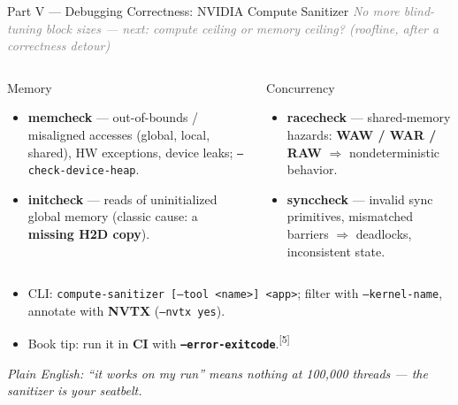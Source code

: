 \documentclass[aspectratio=169]{beamer}
\newcommand{\kw}[1]{\textbf{\textcolor{kwblue}{#1}}}
\newcommand{\pe}[1]{\par{\setlength{\fboxsep}{2.5pt}\noindent\colorbox{navy!9}{\parbox{\dimexpr\textwidth-5pt\relax}{\footnotesize\itshape Plain English: #1}}}}
\newcommand{\bridge}[1]{{\footnotesize\itshape\textcolor{gray}{#1}}\par}
\newcommand{\refmark}[1]{\textsuperscript{[#1]}}
\begin{document}
\begin{frame}{Part V --- Debugging Correctness: NVIDIA Compute Sanitizer}
  \bridge{No more blind-tuning block sizes --- next: compute ceiling or memory ceiling? (roofline, after a correctness detour)}
  \vspace{-4pt}
  \begin{columns}[t]
    \begin{block}{Memory}
      \begin{itemize}\small
        \item \kw{memcheck} --- out-of-bounds / misaligned accesses (global, local, shared),
              HW exceptions, device leaks; \texttt{--check-device-heap}.
        \item \kw{initcheck} --- reads of uninitialized global memory
              (classic cause: a \kw{missing H2D copy}).
      \end{itemize}
    \end{block}
    \begin{exampleblock}{Concurrency}
      \begin{itemize}\small
        \item \kw{racecheck} --- shared-memory hazards: \kw{WAW / WAR / RAW}
              $\Rightarrow$ nondeterministic behavior.
        \item \kw{synccheck} --- invalid sync primitives, mismatched barriers
              $\Rightarrow$ deadlocks, inconsistent state.
      \end{itemize}
    \end{exampleblock}
  \end{columns}
  \begin{itemize}\small
    \item CLI: \texttt{compute-sanitizer [--tool <name>] <app>}; filter with
          \texttt{--kernel-name}, annotate with \kw{NVTX} (\texttt{--nvtx yes}).
    \item Book tip: run it in \kw{CI} with \kw{\texttt{--error-exitcode}}.\refmark{5}
  \end{itemize}
  \pe{``it works on my run'' means nothing at 100{,}000 threads --- the sanitizer is your seatbelt.}
\end{frame}
\end{document}
